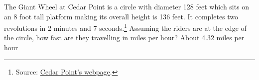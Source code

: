 {The Giant Wheel at Cedar Point is a circle with diameter 128 feet which sits on an 8 foot tall platform making its overall height is 136 feet.    It completes two revolutions in 2 minutes and 7 seconds.\footnote{Source: \href{http://www.cedarpoint.com/public/park/rides/tranquil/giant_wheel.cfm}{\underline{Cedar Point's webpage}}.}  Assuming the riders are at the edge of the circle, how fast are they travelling in miles per hour?
\label{giantwheelmotion}}
{About 4.32 miles per hour}